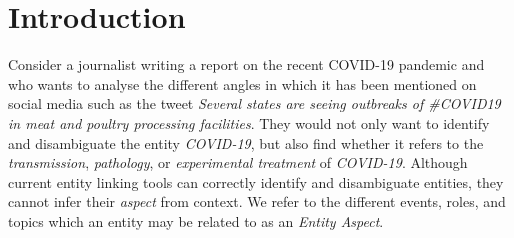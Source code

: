 \documentclass[sigconf,authordraft]{acmart}
\begin{document}

\maketitle

\section{Introduction}
\label{sec:Introduction}


Consider a journalist  writing a report on the recent COVID-19 pandemic and who wants to analyse the different angles in which it has been mentioned on social media such as the tweet \textit{Several states are seeing outbreaks of \#COVID19 in meat and poultry processing facilities}. They would not only want to identify and disambiguate the entity \textit{COVID-19}, but also find whether it refers to the \textit{transmission}, \textit{pathology}, or \textit{experimental treatment} of \textit{COVID-19}. Although current entity linking tools \cite{ferragina2010tagme,mendes2011dbpedia,piccinno2014wat} can correctly identify and disambiguate entities, they cannot infer their \textit{aspect} from context. We refer to the different events, roles, and topics which an entity may be related to as an \textit{Entity Aspect}.
\end{document}

